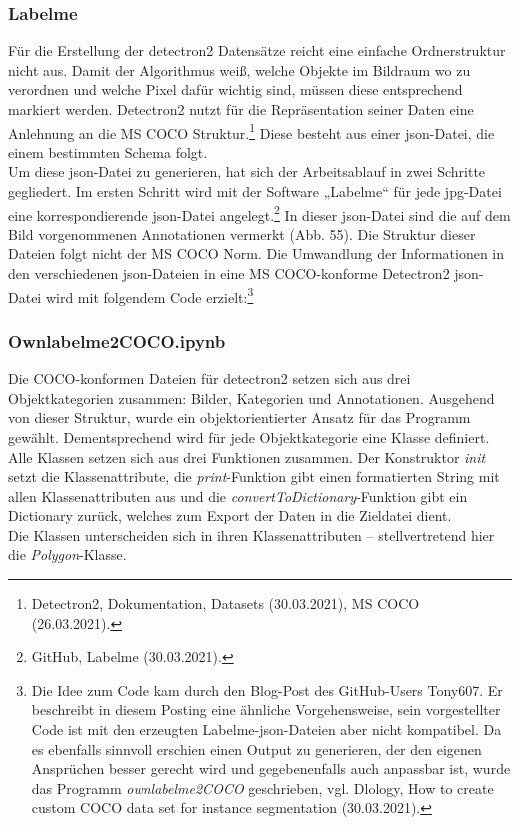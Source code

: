\documentclass[a4paper,12pt,ngerman]{article}
\begin{document}
\subsubsection{Labelme}
Für die Erstellung der detectron2 Datensätze reicht eine einfache Ordnerstruktur nicht aus. Damit der Algorithmus weiß, welche Objekte im Bildraum wo zu verordnen und welche Pixel dafür wichtig sind, müssen diese entsprechend markiert werden. Detectron2 nutzt für die Repräsentation seiner Daten eine Anlehnung an die MS COCO Struktur.\footnote{Detectron2, Dokumentation, Datasets (30.03.2021), MS COCO (26.03.2021).} Diese besteht aus einer json-Datei, die einem bestimmten Schema folgt. \\
Um diese json-Datei zu generieren, hat sich der Arbeitsablauf in zwei Schritte gegliedert. Im ersten Schritt wird mit der Software „Labelme“ für jede jpg-Datei eine korrespondierende json-Datei angelegt.\footnote{GitHub, Labelme (30.03.2021).} In dieser json-Datei sind die auf dem Bild vorgenommenen Annotationen vermerkt (Abb. 55). Die Struktur dieser Dateien folgt nicht der MS COCO Norm. Die Umwandlung der Informationen in den verschiedenen json-Dateien in eine MS COCO-konforme Detectron2 json-Datei wird mit folgendem Code erzielt:\footnote{Die Idee zum Code kam durch den Blog-Post des GitHub-Users Tony607. Er beschreibt in diesem Posting eine ähnliche Vorgehensweise, sein vorgestellter Code ist mit den erzeugten Labelme-json-Dateien aber nicht kompatibel. Da es ebenfalls sinnvoll erschien einen Output zu generieren, der den eigenen Ansprüchen besser gerecht wird und gegebenenfalls auch anpassbar ist, wurde das Programm \textit{ownlabelme2COCO} geschrieben, vgl. Dlology, How to create custom COCO data set for instance segmentation (30.03.2021).}\\

\subsubsection*{Ownlabelme2COCO.ipynb}

Die COCO-konformen Dateien für detectron2 setzen sich aus drei Objektkategorien zusammen: Bilder, Kategorien und Annotationen. Ausgehend von dieser Struktur, wurde ein objektorientierter Ansatz für das Programm gewählt. Dementsprechend wird für jede Objektkategorie eine Klasse definiert.\\
Alle Klassen setzen sich aus drei Funktionen zusammen. Der Konstruktor \textit{init} setzt die Klassenattribute, die \textit{print}-Funktion gibt einen formatierten String mit allen Klassenattributen aus und die \textit{convertToDictionary}-Funktion gibt ein Dictionary zurück, welches zum Export der Daten in die Zieldatei dient. \\
Die Klassen unterscheiden sich in ihren Klassenattributen -- stellvertretend hier die \textit{Polygon}-Klasse. \\
\end{document}
